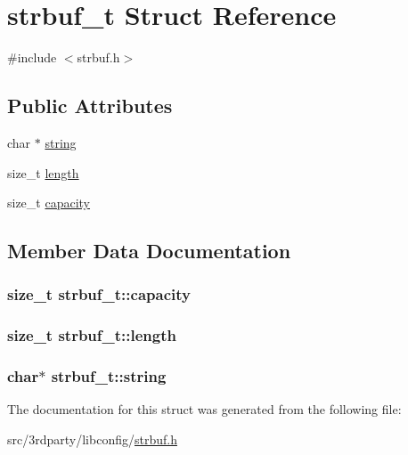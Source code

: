 \hypertarget{structstrbuf__t}{
\section{strbuf\_\-t Struct Reference}
\label{structstrbuf__t}
}


{\ttfamily \#include $<$strbuf.h$>$}

\subsection*{Public Attributes}
\begin{DoxyCompactItemize}
\item 
char $\ast$ \hyperlink{structstrbuf__t_ac33d87e4a1e65b81c34728c08c58e225}{string}
\item 
size\_\-t \hyperlink{structstrbuf__t_ae6fc3758286e761d9c7873b489786a89}{length}
\item 
size\_\-t \hyperlink{structstrbuf__t_af532e798544a7dab19767406c6504649}{capacity}
\end{DoxyCompactItemize}


\subsection{Member Data Documentation}
\hypertarget{structstrbuf__t_af532e798544a7dab19767406c6504649}{
\subsubsection[{capacity}]{\setlength{\rightskip}{0pt plus 5cm}size\_\-t {\bf strbuf\_\-t::capacity}}}
\label{structstrbuf__t_af532e798544a7dab19767406c6504649}
\hypertarget{structstrbuf__t_ae6fc3758286e761d9c7873b489786a89}{
\subsubsection[{length}]{\setlength{\rightskip}{0pt plus 5cm}size\_\-t {\bf strbuf\_\-t::length}}}
\label{structstrbuf__t_ae6fc3758286e761d9c7873b489786a89}
\hypertarget{structstrbuf__t_ac33d87e4a1e65b81c34728c08c58e225}{
\subsubsection[{string}]{\setlength{\rightskip}{0pt plus 5cm}char$\ast$ {\bf strbuf\_\-t::string}}}
\label{structstrbuf__t_ac33d87e4a1e65b81c34728c08c58e225}


The documentation for this struct was generated from the following file:\begin{DoxyCompactItemize}
\item 
src/3rdparty/libconfig/\hyperlink{strbuf_8h}{strbuf.h}\end{DoxyCompactItemize}
